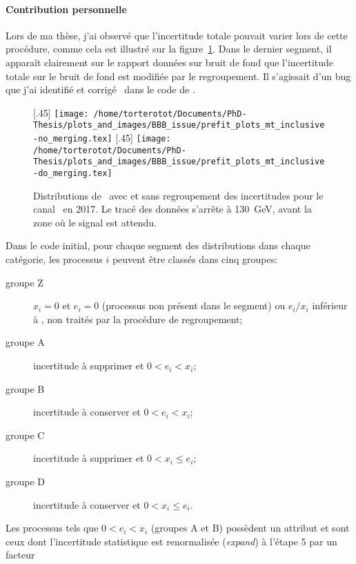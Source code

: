 \paragraph{Contribution personnelle}
Lors de ma thèse, j'ai observé que l'incertitude totale pouvait varier lors de cette procédure, comme cela est illustré sur la figure~\ref{fig-BBB_issue_2017_mt}.
Dans le dernier segment, il apparaît clairement sur le rapport données sur bruit de fond que l'incertitude totale sur le bruit de fond est modifiée par le regroupement.
Il s'agissait d'un bug que j'ai identifié et corrigé~\cite{BBB_PR} dans le code de \COMBINE.
\begin{figure}[h]
\centering

[.45\textwidth]
{\LARGE\texttt{[image: /home/torterotot/Documents/PhD-Thesis/plots\_and\_images/BBB\_issue/prefit\_plots\_mt\_inclusive-no\_merging.tex]}}
\hfill
{}[.45\textwidth]
{\LARGE\texttt{[image: /home/torterotot/Documents/PhD-Thesis/plots\_and\_images/BBB\_issue/prefit\_plots\_mt\_inclusive-do\_merging.tex]}}

\caption[Distributions de \mTtot\ avec et sans regroupement des incertitudes.]{Distributions de \mTtot\ avec et sans regroupement des incertitudes pour le canal \mu\tauh\ en 2017. Le tracé des données s'arrête à \SI{130}{\GeV}, avant la zone où le signal est attendu.}
\label{fig-BBB_issue_2017_mt}
\end{figure}
\par
Dans le code initial,
pour chaque segment des distributions dans chaque catégorie,
les processus $i$ peuvent être classés dans cinq groupes:
\begin{description}
\item[groupe Z] $x_i = 0$ et $e_i = 0$ (processus non présent dans le segment) ou $e_i/x_i$ inférieur à , non traités par la procédure de regroupement;
\item[groupe A] incertitude à supprimer et $0 < e_i < x_i$;
\item[groupe B] incertitude à conserver et $0 < e_i < x_i$;
\item[groupe C] incertitude à supprimer et $0 < x_i \leq e_i$;
\item[groupe D] incertitude à conserver et $0 < x_i \leq e_i$.
\end{description}
Les processus tels que $0 < e_i < x_i$ (groupes A et B)
possèdent un attribut 
et sont ceux dont l'incertitude statistique est renormalisée (\emph{expand}) à l'étape 5 par un facteur
